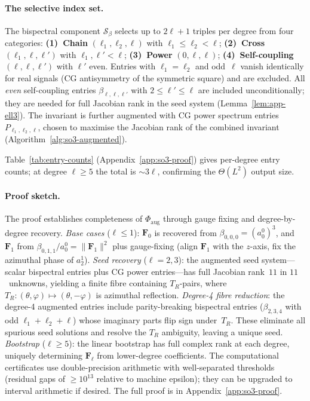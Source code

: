 \documentclass{article}
\theoremstyle{definition}
\theoremstyle{remark}
\newcommand{\norm}[1]{\lVert #1 \rVert}
\theoremstyle{definition}
\begin{document}
\paragraph{The selective index set.}
The bispectral component $\mathcal{S}_\beta$ selects up to
$2\ell{+}1$ triples per degree from four categories:
\textbf{(1)~Chain} $(\ell_1, \ell_2, \ell)$ with
$\ell_1 \leq \ell_2 < \ell$;
\textbf{(2)~Cross} $(\ell_1, \ell, \ell')$ with
$\ell_1, \ell' < \ell$;
\textbf{(3)~Power} $(0, \ell, \ell)$;
\textbf{(4)~Self-coupling} $(\ell, \ell, \ell')$ with $\ell'$ even.
Entries with $\ell_1 = \ell_2$ and odd~$\ell$ vanish identically
for real signals (CG antisymmetry of the symmetric square) and
are excluded.  All \emph{even} self-coupling entries
$\beta_{\ell,\ell,\ell'}$ with $2 \le \ell' \le \ell$ are
included unconditionally; they are needed for full Jacobian rank
in the seed system (Lemma~\ref{lem:app-ell3}).
The invariant is further augmented with
CG power spectrum entries $P_{\ell_1,\ell_2,\ell}$, chosen
to maximise the Jacobian rank of the combined invariant
(Algorithm~\ref{alg:so3-augmented}).

Table~\ref{tab:entry-counts} (Appendix~\ref{app:so3-proof}) gives
per-degree entry counts; at degree $\ell \ge 5$ the total is
${\sim}3\ell$, confirming the $\Theta(L^2)$ output size.

\paragraph{Proof sketch.}
The proof establishes completeness of $\Phi_{\mathrm{aug}}$ through
gauge fixing and degree-by-degree recovery.
\emph{Base cases} ($\ell \le 1$): $\mathbf{F}_0$ is recovered from
$\beta_{0,0,0} = (a_0^0)^3$, and $\mathbf{F}_1$ from
$\beta_{0,1,1}/a_0^0 = \norm{\mathbf{F}_1}^2$ plus gauge-fixing
(align $\mathbf{F}_1$ with the $z$-axis, fix the azimuthal phase
of $a_2^1$).
\emph{Seed recovery} ($\ell = 2, 3$): the augmented seed system---scalar
bispectral entries plus CG power entries---has full Jacobian rank~$11$
in $11$~unknowns, yielding a finite fibre
containing $T_R$-pairs, where $T_R\!: (\theta,\varphi) \mapsto
(\theta,-\varphi)$ is azimuthal reflection.
\emph{Degree-4 fibre reduction}: the degree-4 augmented entries
include parity-breaking bispectral entries ($\beta_{2,3,4}$ with odd
$\ell_1{+}\ell_2{+}\ell$) whose imaginary parts flip sign under~$T_R$.
These eliminate all spurious seed solutions and resolve the $T_R$
ambiguity, leaving a unique seed.
\emph{Bootstrap} ($\ell \ge 5$): the linear bootstrap has full complex
rank at each degree, uniquely determining $\mathbf{F}_\ell$ from
lower-degree coefficients.
The computational certificates use double-precision arithmetic with
well-separated thresholds (residual gaps of $\ge 10^{13}$ relative to
machine epsilon); they can be upgraded to interval arithmetic if desired.
The full proof is in Appendix~\ref{app:so3-proof}.
\end{document}
